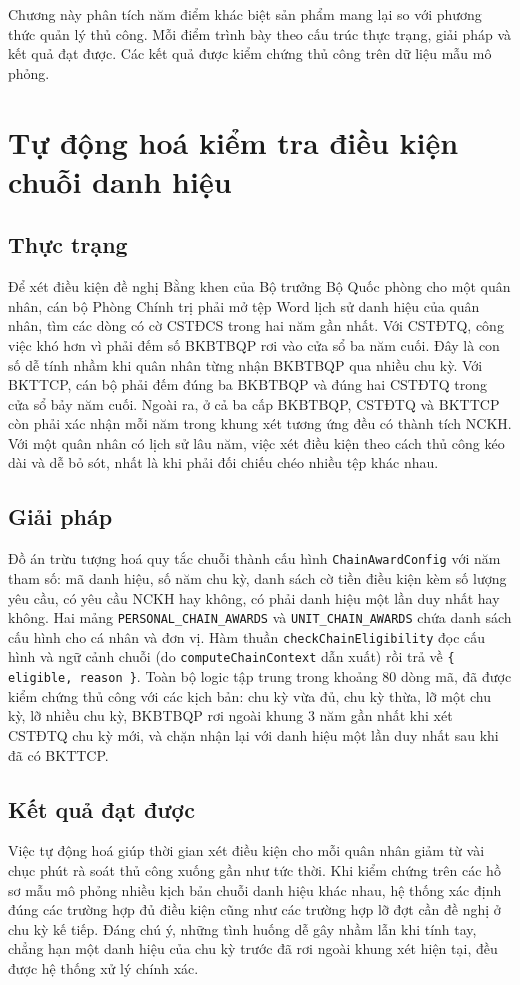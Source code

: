 \documentclass[../DoAn.tex]{subfiles}
\begin{document}
Chương này phân tích năm điểm khác biệt sản phẩm mang lại so với phương thức quản lý thủ công. Mỗi điểm trình bày theo cấu trúc thực trạng, giải pháp và kết quả đạt được. Các kết quả được kiểm chứng thủ công trên dữ liệu mẫu mô phỏng.

\section{Tự động hoá kiểm tra điều kiện chuỗi danh hiệu}
\label{section:5.1}

\subsection*{Thực trạng}
Để xét điều kiện đề nghị Bằng khen của Bộ trưởng Bộ Quốc phòng cho một quân nhân, cán bộ Phòng Chính trị phải mở tệp Word lịch sử danh hiệu của quân nhân, tìm các dòng có cờ CSTĐCS trong hai năm gần nhất. Với CSTĐTQ, công việc khó hơn vì phải đếm số BKBTBQP rơi vào cửa sổ ba năm cuối. Đây là con số dễ tính nhầm khi quân nhân từng nhận BKBTBQP qua nhiều chu kỳ. Với BKTTCP, cán bộ phải đếm đúng ba BKBTBQP và đúng hai CSTĐTQ trong cửa sổ bảy năm cuối. Ngoài ra, ở cả ba cấp BKBTBQP, CSTĐTQ và BKTTCP còn phải xác nhận mỗi năm trong khung xét tương ứng đều có thành tích NCKH. Với một quân nhân có lịch sử lâu năm, việc xét điều kiện theo cách thủ công kéo dài và dễ bỏ sót, nhất là khi phải đối chiếu chéo nhiều tệp khác nhau.

\subsection*{Giải pháp}
Đồ án trừu tượng hoá quy tắc chuỗi thành cấu hình \texttt{ChainAwardConfig} với năm tham số: mã danh hiệu, số năm chu kỳ, danh sách cờ tiền điều kiện kèm số lượng yêu cầu, có yêu cầu NCKH hay không, có phải danh hiệu một lần duy nhất hay không. Hai mảng \texttt{PERSONAL\_CHAIN\_AWARDS} và \texttt{UNIT\_CHAIN\_AWARDS} chứa danh sách cấu hình cho cá nhân và đơn vị. Hàm thuần \texttt{checkChainEligibility} đọc cấu hình và ngữ cảnh chuỗi (do \texttt{computeChainContext} dẫn xuất) rồi trả về \texttt{\{ eligible, reason \}}. Toàn bộ logic tập trung trong khoảng 80 dòng mã, đã được kiểm chứng thủ công với các kịch bản: chu kỳ vừa đủ, chu kỳ thừa, lỡ một chu kỳ, lỡ nhiều chu kỳ, BKBTBQP rơi ngoài khung 3 năm gần nhất khi xét CSTĐTQ chu kỳ mới, và chặn nhận lại với danh hiệu một lần duy nhất sau khi đã có BKTTCP.

\subsection*{Kết quả đạt được}
Việc tự động hoá giúp thời gian xét điều kiện cho mỗi quân nhân giảm từ vài chục phút rà soát thủ công xuống gần như tức thời. Khi kiểm chứng trên các hồ sơ mẫu mô phỏng nhiều kịch bản chuỗi danh hiệu khác nhau, hệ thống xác định đúng các trường hợp đủ điều kiện cũng như các trường hợp lỡ đợt cần đề nghị ở chu kỳ kế tiếp. Đáng chú ý, những tình huống dễ gây nhầm lẫn khi tính tay, chẳng hạn một danh hiệu của chu kỳ trước đã rơi ngoài khung xét hiện tại, đều được hệ thống xử lý chính xác.
\end{document}
